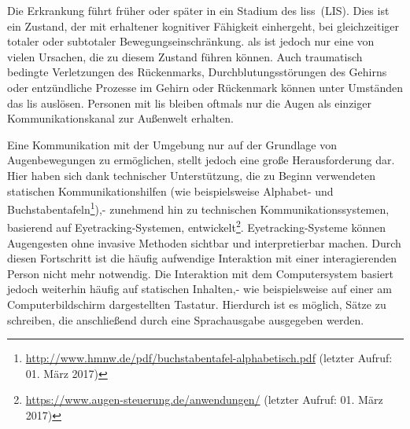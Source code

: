 \begin{comment}
\begin{figure}[ht]
   \begin{minipage}[t]{\linewidth} 
      \centering 
      \texttt{[image: bilder/grundlagen/1als.pdf]}
   \end{minipage}%
   \caption{Sterbefälle 1998 bis 2015 für die spinale Muskelatrophie und verwandte Syndrome (ICD-10 Code: G12), Statistisches Bundesamt (Destatis), 2017. In www.destatis.de (Thematische Recherche: Zahlen \& Fakten - Gesellschaft \& Staat - Gesundheit - Todesursachen - Dokumentart: Tabelle). Abrufdatum: 19. Februar 2017 \protect\footnotemark }\label{fig:stat} 
\end{figure} 
\end{comment}
Die Erkrankung führt früher oder später in ein Stadium des \aclp{lis}~(LIS). Dies ist ein Zustand, der mit erhaltener kognitiver Fähigkeit einhergeht, bei gleichzeitiger totaler oder subtotaler Bewegungseinschränkung. \acs{als} ist jedoch nur eine von vielen Ursachen, die zu diesem Zustand führen können. Auch traumatisch bedingte Verletzungen des Rückenmarks, Durchblutungsstörungen des Gehirns oder entzündliche Prozesse im Gehirn oder Rückenmark können unter Umständen das \acs{lis} auslösen.
Personen mit \acs{lis} bleiben oftmals nur die Augen als einziger Kommunikationskanal zur Außenwelt erhalten. 

Eine Kommunikation mit der Umgebung nur auf der Grundlage von Augenbewegungen zu ermöglichen, stellt jedoch eine große Herausforderung dar. Hier haben sich dank technischer Unterstützung, die zu Beginn verwendeten statischen Kommunikationshilfen (wie beispielsweise Alphabet- und Buchstabentafeln\footnote{\url{http://www.hmnw.de/pdf/buchstabentafel-alphabetisch.pdf} (letzter Aufruf: 01. März 2017)}),- zunehmend hin zu technischen Kommunikationssystemen, basierend auf Eyetracking-Systemen, entwickelt\footnote{\url{https://www.augen-steuerung.de/anwendungen/} (letzter Aufruf: 01. März 2017)}. Eyetracking-Systeme können Augengesten ohne invasive Methoden sichtbar und interpretierbar machen. Durch diesen Fortschritt ist die häufig aufwendige Interaktion mit einer interagierenden Person nicht mehr notwendig. Die Interaktion mit dem Computersystem basiert jedoch weiterhin häufig auf statischen Inhalten,- wie beispielsweise auf einer am Computerbildschirm dargestellten Tastatur. Hierdurch ist es möglich, Sätze zu schreiben, die anschließend durch eine Sprachausgabe ausgegeben werden.

